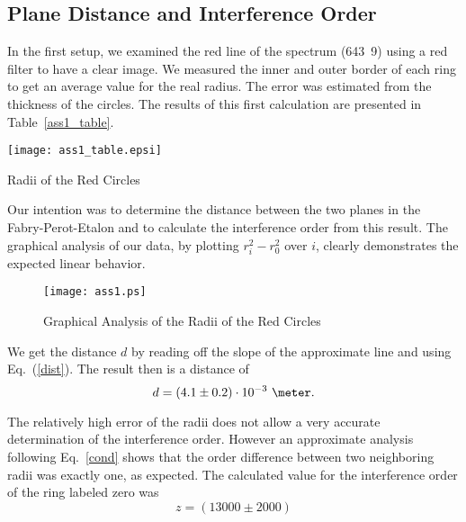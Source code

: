 \documentclass[a4paper,10pt]{article}
\begin{document}
\subsection{Plane Distance and Interference Order}
In the first setup, we examined the red line of the spectrum (\unit{643.9}{\nano\meter}) using a red filter to have a clear image. We measured the inner and outer border of each ring to get an average value for the real radius. The error was estimated from the thickness of the circles. The results of this first calculation are presented in Table~\ref{ass1_table}.
\begin{table}[h]
    \centering
    \texttt{[image: ass1\_table.epsi]}
    \caption{Radii of the Red Circles}
    \label{ass1_table}
\end{table}

Our intention was to determine the distance between the two planes in the Fabry-Perot-Etalon and to calculate the interference order from this result. The graphical analysis of our data, by plotting $r_i^2-r_0^2$ over $i$, clearly demonstrates the expected linear behavior.
\begin{figure}[h]
    \centering
    \texttt{[image: ass1.ps]}
    \caption{Graphical Analysis of the Radii of the Red Circles}
    \label{ass1}
\end{figure}

We get the distance $d$ by reading off the slope of the approximate line and using Eq.~(\ref{dist}). The result then is a distance of
\begin{equation*}
d = (4.1 \pm 0.2) \cdot 10^{-3} \text{ \meter}.
\end{equation*}

The relatively high error of the radii does not allow a very accurate determination of the interference order. However an approximate analysis following Eq.~\ref{cond} shows that the order difference between two neighboring radii was exactly one, as expected. The calculated value for the interference order of the ring labeled zero was
\begin{equation*}
z = (13000 \pm 2000)
\end{equation*}
\end{document}
